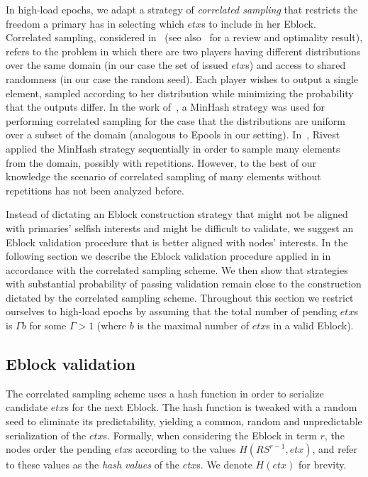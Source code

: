 In high-load epochs, we adapt a strategy of \emph{correlated sampling} that restricts the freedom a primary has in selecting which $etx$s to include in her Eblock.
Correlated sampling, considered in~\cite{HashSample1,HashSample2,HashSample3} (see also~\cite{OptCorSampling} for a review and optimality result), refers to the problem in which there are two players having different distributions over the same domain (in our case the set of issued $etx$s) and access to shared randomness (in our case the random seed). Each player wishes to output a single element, sampled according to her distribution while minimizing the probability that the outputs differ. In the work of~\cite{HashSample1}, a MinHash strategy was used for performing correlated sampling for the case that the distributions are uniform over a subset of the domain (analogous to Epools in our setting). In~\cite{hashsamplemultiple}, Rivest applied the MinHash strategy sequentially in order to sample many elements from the domain, possibly with repetitions. However, to the best of our knowledge the scenario of correlated sampling of many elements without repetitions has not been analyzed before.   

Instead of dictating an Eblock construction strategy that might not be aligned with primaries' selfish interests and might be difficult to validate, we suggest an Eblock validation procedure that is better aligned with nodes' interests. In the following section we describe the Eblock validation procedure applied in \name in accordance with the correlated sampling scheme. We then show that strategies with substantial probability of passing validation remain close to the construction dictated by the correlated sampling scheme. Throughout this section we restrict ourselves to high-load epochs by assuming that the total number of pending $etx$s is $\Gamma b$ for some $\Gamma > 1$ (where $b$ is the maximal number of $etx$s in a valid Eblock). 

\subsection{Eblock validation} \label{Validation}
The \name correlated sampling scheme uses a hash function in order to serialize candidate $etx$s for the next Eblock. The hash function is tweaked with a random seed to eliminate its predictability, yielding a common, random and unpredictable serialization of the $etx$s. Formally, when considering the Eblock in term $r$, the nodes order the pending $etx$s according to the values $H(RS^{r-1},etx)$, and refer to these values as the \textit{hash values} of the $etx$s. We denote $H(etx)$ for brevity. 

